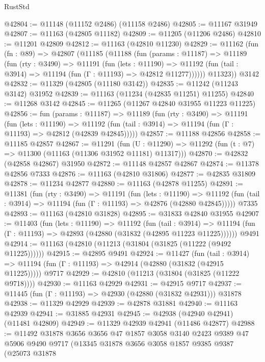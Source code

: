 \begin{lexlean}{RustStd}
\begin{coremodule}
@42804 := @11148 (@11152 @2486) (@11158 @2486)
@42805 := @11167 @31949
@42807 := @11163 (@42805 @11182)
@42809 := @11205 (@11206 @2486)
@42810 := @11201 @42809
@42812 := @11163 (@42810 @11230)
@42829 := @11162
    (fun (fn : @89) =>
    @42807
      (@11185
        (@11188
          (fun (params : @11187) =>
          @11189
            (fun (rty : @3490) =>
            @11191
              (fun (lets : @11190) =>
              @11192 (fun (tail : @3914) => @11194 (fun (Γ : @11193) => @42812 @11277))))))
        @11323))
    @3142
@42832 := @11329 (@42805 (@11180 @3142))
@42835 := @11242 (@11243 @3142) @31952
@42839 := @11163 (@11234 (@42835 @11251) @11255)
@42840 := @11268 @3142
@42845 := @11265 (@11267 @42840 @31955 @11223 @11225)
@42856 := fun (params : @11187) =>
  @11189
    (fun (rty : @3490) =>
    @11191
      (fun (lets : @11190) =>
      @11192 (fun (tail : @3914) => @11194 (fun (Γ : @11193) => @42812 (@42839 @42845)))))
@42857 := @11188 @42856
@42858 := @11185 @42857
@42867 := @11291
    (fun (U : @11290) => @11292 (fun (t : @7) => @11300 (@11163 (@11306 @31952 @11181) @11317)))
@42870 := @42832 (@42858 @42867) @31950
@42872 := @11148 @42857 @42867
@42874 := @11378 @42856 @7333
@42876 := @11163 (@42810 @31806)
@42877 := @42835 @31809
@42878 := @11234 @42877
@42880 := @11163 (@42878 @11255)
@42891 := @11381
    (fun (rty : @3490) =>
    @11191
      (fun (lets : @11190) =>
      @11192 (fun (tail : @3914) => @11194 (fun (Γ : @11193) => @42876 (@42880 @42845)))))
    @7335
@42893 := @11163 (@42810 @31828)
@42895 := @31833 @42840 @31955
@42907 := @11403
    (fun (lets : @11190) =>
    @11192
      (fun (tail : @3914) =>
      @11194 (fun (Γ : @11193) => @42893 (@42880 (@31832 (@42895 @11223 @11225))))))
    @9491
@42914 := @11163 (@42810 (@11213 (@31804 (@31825 (@11222 (@9492 @11225))))))
@42915 := @42895 @9491
@42924 := @11427
    (fun (tail : @3914) => @11194 (fun (Γ : @11193) => @42914 (@42880 (@31832 (@42915 @11225)))))
    @9717
@42929 := @42810 (@11213 (@31804 (@31825 (@11222 @9718))))
@42930 := @11163 @42929
@42931 := @42915 @9717
@42937 := @11445 (fun (Γ : @11193) => @42930 (@42880 (@31832 @42931))) @31878
@42938 := @11329 @42929
@42939 := @42878 @31881
@42940 := @11163 @42939
@42941 := @31885 @42931
@42945 := @42938 (@42940 @42941) (@11481 @42809)
@42949 := @11329 @42939 @42941 (@11486 @42877)
@42988 := @11492
    @31878
    @3656
    @3656
    @47
    @1857
    @3058
    @3140
    @2423
    @9389
    @47
    @5906
    @9490
    @9717
    (@13345
      @31878
      @3656
      @3058
      @1857
      @9385
      @9387
      (@25073
        @31878

\end{coremodule}
\end{lexlean}
